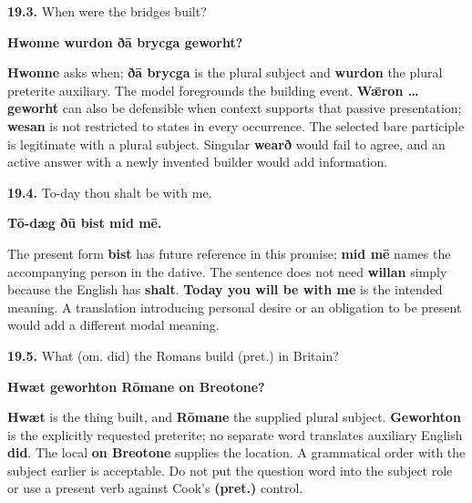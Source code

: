 \par\begin{minipage}{\linewidth}\raggedright
\textbf{19.3.} When were the bridges built?

\textbf{Hwonne wurdon ðā brycga geworht?}

\textbf{Hwonne} asks when; \textbf{ðā brycga} is the plural subject and \textbf{wurdon} the plural preterite auxiliary. The model foregrounds the building event. \textbf{Wǣron … geworht} can also be defensible when context supports that passive presentation; \textbf{wesan} is not restricted to states in every occurrence. The selected bare participle is legitimate with a plural subject. Singular \textbf{wearð} would fail to agree, and an active answer with a newly invented builder would add information.

\end{minipage}\par\addvspace{4pt}

\par\begin{minipage}{\linewidth}\raggedright
\textbf{19.4.} To-day thou shalt be with me.

\textbf{Tō-dæg ðū bist mid mē.}

The present form \textbf{bist} has future reference in this promise; \textbf{mid mē} names the accompanying person in the dative. The sentence does not need \textbf{willan} simply because the English has \textbf{shalt}. \textbf{Today you will be with me} is the intended meaning. A translation introducing personal desire or an obligation to be present would add a different modal meaning.

\end{minipage}\par\addvspace{4pt}

\par\begin{minipage}{\linewidth}\raggedright
\textbf{19.5.} What (om. did) the Romans build (pret.) in Britain?

\textbf{Hwæt geworhton Rōmane on Breotone?}

\textbf{Hwæt} is the thing built, and \textbf{Rōmane} the supplied plural subject. \textbf{Geworhton} is the explicitly requested preterite; no separate word translates auxiliary English \textbf{did}. The local \textbf{on Breotone} supplies the location. A grammatical order with the subject earlier is acceptable. Do not put the question word into the subject role or use a present verb against Cook's \textbf{(pret.)} control.

\end{minipage}\par\addvspace{4pt}

